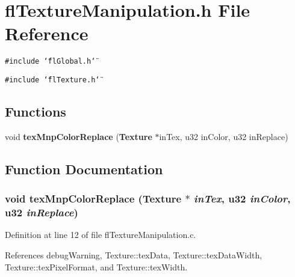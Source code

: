 \section{fl\-Texture\-Manipulation.h File Reference}
\label{flTextureManipulation_8h}
{\tt \#include \char`\"{}fl\-Global.h\char`\"{}}\par
{\tt \#include \char`\"{}fl\-Texture.h\char`\"{}}\par
\subsection*{Functions}
\begin{CompactItemize}
\item 
void {\bf tex\-Mnp\-Color\-Replace} ({\bf Texture} $\ast$in\-Tex, u32 in\-Color, u32 in\-Replace)
\end{CompactItemize}


\subsection{Function Documentation}
\subsubsection{\setlength{\rightskip}{0pt plus 5cm}void tex\-Mnp\-Color\-Replace ({\bf Texture} $\ast$ {\em in\-Tex}, u32 {\em in\-Color}, u32 {\em in\-Replace})}\label{flTextureManipulation_8h_6c5c446927e8bb7d66c6fadf42fc53f2}




Definition at line 12 of file fl\-Texture\-Manipulation.c.

References debug\-Warning, Texture::tex\-Data, Texture::tex\-Data\-Width, Texture::tex\-Pixel\-Format, and Texture::tex\-Width.